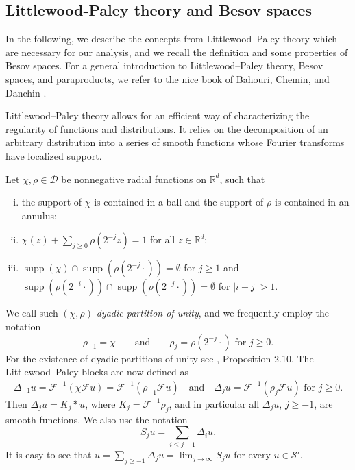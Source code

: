 \documentclass[a4paper,11pt]{article}
\newcommand{\cdummy}{\cdot}
\newcommand{\nocomma}{}
\newcommand{\tmop}[1]{\ensuremath{\operatorname{#1}}}
\newcommand{\tmtextit}[1]{{\itshape{#1}}}
\newenvironment{enumerateroman}{\begin{enumerate}[i.] }{\end{enumerate}}
\theoremstyle{remark}
\newcommand{\CD}{\ensuremath{\mathscr{D}}}
\newcommand{\CF}{\ensuremath{\mathscr{F}}}
\newcommand{\CS}{\ensuremath{\mathscr{S}}}
\begin{document}
\subsection{Littlewood-Paley theory and Besov spaces}\label{sec:littlewood}

In the following, we describe the concepts from Littlewood--Paley theory which are necessary for our analysis, and we recall the definition and some properties of Besov spaces. For a general introduction to Littlewood--Paley theory, Besov spaces, and paraproducts, we refer to the nice book of Bahouri, Chemin, and Danchin {\cite{Bahouri2011}}.

Littlewood--Paley theory allows for an efficient way of characterizing the regularity of functions and distributions. It relies on the decomposition of an arbitrary distribution into a series of smooth functions whose Fourier transforms have localized support.

Let $\chi \nocomma , \rho \in \CD$ be nonnegative radial functions on $\mathbb{R}^{d}$, such that
\begin{enumerateroman}
  \item the support of $\chi$ is contained in a ball and the support of $\rho$ is contained in an annulus;
  
  \item $\chi ( z ) + \sum_{j \geqslant 0} \rho ( 2^{-j} z ) =1$ for all $z \in \mathbb{R}^{d}$;
  
  \item \label{def:dyadic partition3}$\tmop{supp} ( \chi ) \cap \tmop{supp} (\rho ( 2^{-j} \cdummy ) ) = \emptyset$ for $j \geqslant 1$ and $\tmop{supp}( \rho ( 2^{-i} \cdummy ) ) \cap \tmop{supp} ( \rho ( 2^{-j} \cdummy ) ) =  \emptyset$ for $| i-j | >1$.
\end{enumerateroman}
We call such $( \chi , \rho )$ \tmtextit{dyadic partition of unity}, and we frequently employ the notation
\[
   \rho_{-1} = \chi \qquad \text{and} \qquad \rho_{j} = \rho (2^{-j} \cdummy ) \text{ for } j \geqslant 0.
\]
For the existence of dyadic partitions of unity see {\cite{Bahouri2011}}, Proposition 2.10. The Littlewood--Paley blocks are now defined as
\[
   \Delta_{-1} u= \CF^{-1} \left( \chi \CF u \right) = \CF^{-1} \left( \rho_{-1} \CF u \right) \quad \text{and} \quad \Delta_{j} u= \CF^{-1} \left( \rho_{j} \CF u \right) \text{ for }  j \geqslant 0. 
\]
Then $\Delta_{j} u=K_{j} \ast u$, where $K_{j} = \CF^{-1} \rho_{j}$, and in particular all $\Delta_{j} u$, $j \geqslant -1$, are smooth functions. We also use the notation
\[
   S_{j} u= \sum_{i \leqslant j-1} \Delta_{i} u.
\]
It is easy to see that $u =  \sum_{j \geqslant -1} \Delta_{j} u= \lim_{j \rightarrow \infty} S_{j} u$ for every $u \in \CS'$.
\end{document}
